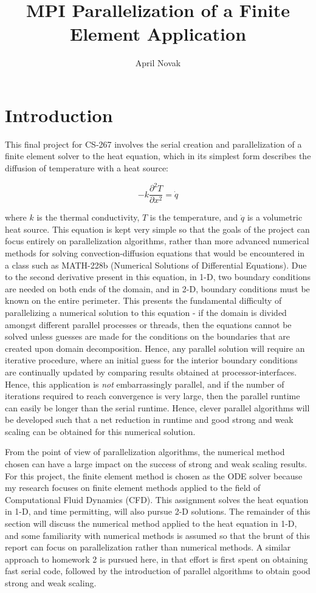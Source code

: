 \documentclass[10pt]{article}
\title{MPI Parallelization of a Finite Element Application}
\author{April Novak}
\newcommand{\beq}{\begin{equation}}
\newcommand{\eeq}{\end{equation}}
\begin{document}
\maketitle

\section{Introduction}

This final project for CS-267 involves the serial creation and parallelization of a finite element solver to the heat equation, which in its simplest form describes the diffusion of temperature with a heat source:

\beq
\label{eq:eq}
-k\frac{\partial^2 T}{\partial x^2}=\dot{q}
\eeq

where \(k\) is the thermal conductivity, \(T\) is the temperature, and \(\dot{q}\) is a volumetric heat source. This equation is kept very simple so that the goals of the project can focus entirely on parallelization algorithms, rather than more advanced numerical methods for solving convection-diffusion equations that would be encountered in a class such as MATH-228b (Numerical Solutions of Differential Equations). Due to the second derivative present in this equation, in 1-D, two boundary conditions are needed on both ends of the domain, and in 2-D, boundary conditions must be known on the entire perimeter. This presents the fundamental difficulty of parallelizing a numerical solution to this equation - if the domain is divided amongst different parallel processes or threads, then the equations cannot be solved unless guesses are made for the conditions on the boundaries that are created upon domain decomposition. Hence, any parallel solution will require an iterative procedure, where an initial guess for the interior boundary conditions are continually updated by comparing results obtained at processor-interfaces. Hence, this application is \textit{not} embarrassingly parallel, and if the number of iterations required to reach convergence is very large, then the parallel runtime can easily be longer than the serial runtime. Hence, clever parallel algorithms will be developed such that a net reduction in runtime and good strong and weak scaling can be obtained for this numerical solution.

From the point of view of parallelization algorithms, the numerical method chosen can have a large impact on the success of strong and weak scaling results. For this project, the finite element method is chosen as the ODE solver because my research focuses on finite element methods applied to the field of Computational Fluid Dynamics (CFD). This assignment solves the heat equation in 1-D, and time permitting, will also pursue 2-D solutions. The remainder of this section will discuss the numerical method applied to the heat equation in 1-D, and some familiarity with numerical methods is assumed so that the brunt of this report can focus on parallelization rather than numerical methods. A similar approach to homework 2 is pursued here, in that effort is first spent on obtaining fast serial code, followed by the introduction of parallel algorithms to obtain good strong and weak scaling.
\end{document}
